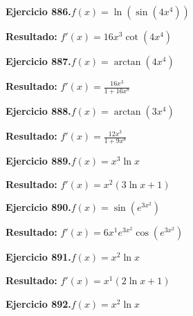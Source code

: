 \documentclass[10pt,a4paper]{article}
\begin{document}
\newpage
\begin{ejbox}
\textbf{Ejercicio 886.}\quad $f(x) = \ln(\sin(4x^{4}))$
\end{ejbox}

\begin{solbox}
\textbf{Resultado:} \(\displaystyle f'(x) = 16x^{3}\cot(4x^{4})\)
\end{solbox}

\begin{ejbox}
\textbf{Ejercicio 887.}\quad $f(x) = \arctan(4x^{4})$
\end{ejbox}

\begin{solbox}
\textbf{Resultado:} \(\displaystyle f'(x) = \frac{16x^{3}}{1+16x^{8}}\)
\end{solbox}

\begin{ejbox}
\textbf{Ejercicio 888.}\quad $f(x) = \arctan(3x^{4})$
\end{ejbox}

\begin{solbox}
\textbf{Resultado:} \(\displaystyle f'(x) = \frac{12x^{3}}{1+9x^{8}}\)
\end{solbox}

\newpage
\begin{ejbox}
\textbf{Ejercicio 889.}\quad $f(x) = x^{3} \ln x$
\end{ejbox}

\begin{solbox}
\textbf{Resultado:} \(\displaystyle f'(x) = x^{2}(3\ln x + 1)\)
\end{solbox}

\begin{ejbox}
\textbf{Ejercicio 890.}\quad $f(x) = \sin(e^{3x^{2}})$
\end{ejbox}

\begin{solbox}
\textbf{Resultado:} \(\displaystyle f'(x) = 6x^{1}e^{3x^{2}}\cos(e^{3x^{2}})\)
\end{solbox}

\begin{ejbox}
\textbf{Ejercicio 891.}\quad $f(x) = x^{2} \ln x$
\end{ejbox}

\begin{solbox}
\textbf{Resultado:} \(\displaystyle f'(x) = x^{1}(2\ln x + 1)\)
\end{solbox}

\newpage
\begin{ejbox}
\textbf{Ejercicio 892.}\quad $f(x) = x^{2} \ln x$
\end{ejbox}
\end{document}
